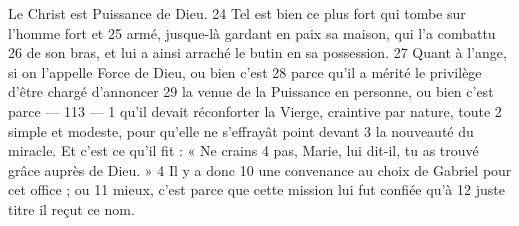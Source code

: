 Le Christ est Puissance de Dieu.	 
24	 	Tel est bien ce plus fort qui tombe sur l'homme fort et	 
25	 	armé, jusque-là gardant en paix sa maison, qui l'a combattu	 
26	 	de son bras, et lui a ainsi arraché le butin en sa possession.	 
27	 	Quant à l'ange, si on l'appelle Force de Dieu, ou bien c'est	 
28	 	parce qu'il a mérité le privilège d'être chargé d'annoncer	 
29	 	la venue de la Puissance en personne, ou bien c'est parce	 
 	--- 113 ---	 
1	 	qu'il devait réconforter la Vierge, craintive par nature, toute	 
2	 	simple et modeste, pour qu'elle ne s'effrayât point devant	 
3	 	la nouveauté du miracle. Et c'est ce qu'il fit : « Ne crains	 
4	 	pas, Marie, lui dit-il, tu as trouvé grâce auprès de Dieu. »	
 4 Il y a donc	 
10	 	une convenance au choix de Gabriel pour cet office ; ou	 
11	 	mieux, c'est parce que cette mission lui fut confiée qu'à	 
12	 	juste titre il reçut ce nom.